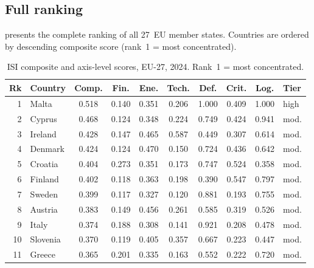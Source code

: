 \subsection{Full ranking}\label{sec:ranking}

 presents the complete ranking of all 27~EU member
states.  Countries are ordered by descending composite score (rank~1
= most concentrated).

\begin{table}[htbp]
\centering
\caption{ISI composite and axis-level scores, EU-27, 2024.  Rank~1
  = most concentrated.}%
\label{tab:ranking}
\small
\setlength{\tabcolsep}{4pt}
\begin{tabular*}{\textwidth}{@{\extracolsep{\fill}}
  r l
  S[table-format=1.3,round-precision=3]
  S[table-format=1.3,round-precision=3]
  S[table-format=1.3,round-precision=3]
  S[table-format=1.3,round-precision=3]
  S[table-format=1.3,round-precision=3]
  S[table-format=1.3,round-precision=3]
  S[table-format=1.3,round-precision=3]
  l@{}}
  \toprule
  {\textbf{Rk}} & {\textbf{Country}} & {\textbf{Comp.}}
    & {\textbf{Fin.}} & {\textbf{Ene.}} & {\textbf{Tech.}}
    & {\textbf{Def.}} & {\textbf{Crit.}} & {\textbf{Log.}}
    & {\textbf{Tier}} \\
    & Malta        & 0.518 & 0.140 & 0.351 & 0.206 & 1.000 & 0.409 & 1.000 & high \\
  2  & Cyprus       & 0.468 & 0.124 & 0.348 & 0.224 & 0.749 & 0.424 & 0.941 & mod. \\
  3  & Ireland      & 0.428 & 0.147 & 0.465 & 0.587 & 0.449 & 0.307 & 0.614 & mod. \\
  4  & Denmark      & 0.424 & 0.124 & 0.470 & 0.150 & 0.724 & 0.436 & 0.642 & mod. \\
  5  & Croatia      & 0.404 & 0.273 & 0.351 & 0.173 & 0.747 & 0.524 & 0.358 & mod. \\
  6  & Finland      & 0.402 & 0.118 & 0.363 & 0.198 & 0.390 & 0.547 & 0.797 & mod. \\
  7  & Sweden       & 0.399 & 0.117 & 0.327 & 0.120 & 0.881 & 0.193 & 0.755 & mod. \\
  8  & Austria      & 0.383 & 0.149 & 0.456 & 0.261 & 0.585 & 0.319 & 0.526 & mod. \\
  9  & Italy        & 0.374 & 0.188 & 0.308 & 0.141 & 0.921 & 0.208 & 0.478 & mod. \\
  10 & Slovenia     & 0.370 & 0.119 & 0.405 & 0.357 & 0.667 & 0.223 & 0.447 & mod. \\
  11 & Greece       & 0.365 & 0.201 & 0.335 & 0.163 & 0.552 & 0.222 & 0.720 & mod. \\

\end{tabular*}
\end{table}
